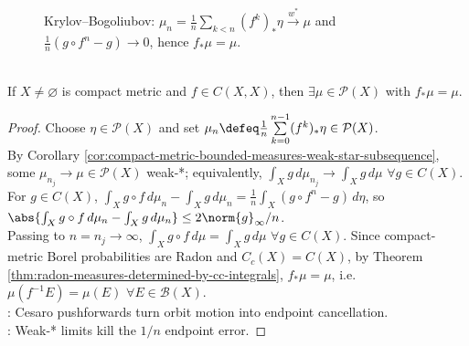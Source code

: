 \begin{figure}[H]
  \centering
  
  \caption{Krylov--Bogoliubov: $\mu_n=\frac1n\sum_{k<n}(f^k)_*\eta\xrightarrow{w^*}\mu$ and $\frac1n(g\circ f^n-g)\to0$, hence $f_*\mu=\mu$.}
  \label{fig:krylov-bogoliubov-averaging-flow}
\end{figure}

\begin{theorem} \label{thm:bogoliubov-krilov-invariant-measure} \\
If $X\ne\varnothing$ is compact metric and $f\in C(X,X)$, then $\exists\mu\in\mathcal{P}(X)$ with $f_*\mu=\mu$.
\begin{proof} Choose $\eta\in\mathcal{P}(X)$ and set $\mu_n\defeq\frac1n\sum\limits_{k=0}^{n-1}(f^k)_*\eta\in\mathcal{P}(X)$.\\
By Corollary \ref{cor:compact-metric-bounded-measures-weak-star-subsequence}, some $\mu_{n_j}\to\mu\in\mathcal{P}(X)$ weak-*; equivalently, $\int_X g\,d\mu_{n_j}\to\int_X g\,d\mu$ $\forall g\in C(X)$.\\
For $g\in C(X)$, $\int_X g\circ f\,d\mu_n-\int_X g\,d\mu_n=\frac1n\int_X(g\circ f^n-g)\,d\eta$, so $\abs{\int_X g\circ f\,d\mu_n-\int_X g\,d\mu_n}\le2\norm{g}_\infty/n$.\\
Passing to $n=n_j\to\infty$, $\int_X g\circ f\,d\mu=\int_X g\,d\mu$ $\forall g\in C(X)$. Since compact-metric Borel probabilities are Radon and $C_c(X)=C(X)$, by Theorem \ref{thm:radon-measures-determined-by-cc-integrals}, $f_*\mu=\mu$, i.e. $\mu(f^{-1}E)=\mu(E)$ $\forall E\in\mathcal{B}(X)$.\\
: Cesaro pushforwards turn orbit motion into endpoint cancellation.\\
: Weak-* limits kill the $1/n$ endpoint error.
\end{proof}
\end{theorem}

